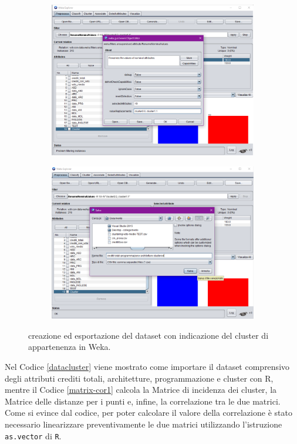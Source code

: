 \documentclass[12pt]{article}
\begin{document}
\begin{figure}
	\begin{subfigure}[b]{0.496\textwidth}
		\includegraphics[width=\textwidth]{img/save-cluster-ass-3.pdf}
		\end{subfigure}
		\begin{subfigure}[b]{0.496\textwidth}
		\includegraphics[width=\textwidth]{img/save-cluster-ass-4.pdf}
		\end{subfigure}
		\caption{creazione ed esportazione del dataset con indicazione del cluster di appartenenza in Weka.}
		\label{fig:add-cluster}
\end{figure}
\newpage
Nel Codice \ref{datacluster} viene mostrato come importare il dataset comprensivo degli attributi crediti totali, architetture, programmazione e cluster con R, mentre il Codice \ref{matrix-cor1} calcola la Matrice di incidenza dei cluster, la Matrice delle distanze per i punti e, infine, la correlazione tra le due matrici. 
Come si evince dal codice, per poter calcolare il valore della correlazione è stato necessario linearizzare preventivamente le due matrici utilizzando l'istru\-zione \texttt{as.vector} di \texttt{R}.
\end{document}
